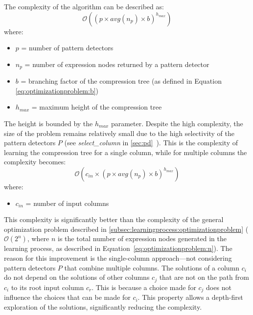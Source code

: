 The complexity of the algorithm can be described as:
\begin{equation}
\label{eq:learning:recursiveexhaustive:single}
    \mathcal{O}((p \times \mathit{avg}(n_{p}) \times b) ^ {h_{max}})
\end{equation}
where:
\begin{itemize}
    \item[] \(p\) = number of pattern detectors
    \item[] \(n_{p}\) = number of expression nodes returned by a pattern detector
    \item[] \(b\) = branching factor of the compression tree (as defined in Equation \ref{eq:optimizationproblem:b})
    \item[] \(h_{max}\) = maximum height of the compression tree
\end{itemize}
The height is bounded by the \(h_{max}\) parameter. Despite the high complexity, the size of the problem remains relatively small due to the high selectivity of the pattern detectors \(P\) (see \textit{select\_column} in \ref{sec:pd}~). This is the complexity of learning the compression tree for a single column, while for multiple columns the complexity becomes:
\begin{equation}
\label{eq:learning:recursiveexhaustive:multi}
    \mathcal{O}(c_{in} \times (p \times \mathit{avg}(n_{p}) \times b) ^ {h_{max}})
\end{equation}
where:
\begin{itemize}
    \item[] \(c_{in}\) = number of input columns
\end{itemize}

This complexity is significantly better than the complexity of the general optimization problem described in \ref{subsec:learningprocess:optimizationproblem} (\(\mathcal{O}(2^n)\), where \(n\) is the total number of expression nodes generated in the learning process, as described in Equation~\ref{eq:optimizationproblem:n}). The reason for this improvement is the single-column approach---not considering pattern detectors \(P\) that combine multiple columns. The solutions of a column \(c_{i}\) do not depend on the solutions of other columns \(c_{j}\) that are not on the path from \(c_{i}\) to its root input column \(c_{r}\). This is because a choice made for \(c_{j}\) does not influence the choices that can be made for \(c_{i}\).
This property allows a depth-first exploration of the solutions, significantly reducing the complexity.

